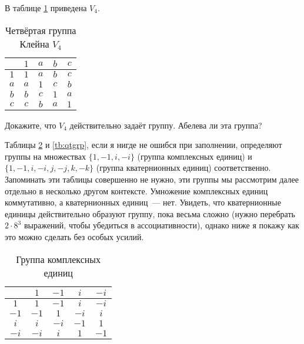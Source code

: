 \begin{example}
	В таблице \ref{tb:v4} приведена  $V_4$.
\end{example}

\begin{table}[h]
	\centering
	\begin{tabular}{c|cccc}
		& $1$ & $a$ & $b$ & $c$ \\ 
		\hline $1$ & $1$ & $a$ & $b$ & $c$ \\ 
		$a$ & $a$ & $1$ & $c$ & $b$ \\ 
		$b$ & $b$ & $c$ & $1$ & $a$ \\ 
		$c$ & $c$ & $b$ & $a$ & $1$ \\ 
	\end{tabular}
	\caption{Четвёртая группа Клейна $V_4$}\label{tb:v4}
\end{table}

\begin{exercise}
	Докажите, что $V_4$ действительно задаёт группу. Абелева ли эта группа?
\end{exercise}

\begin{example}
	Таблицы \ref{tb:cmplxgrp} и \ref{tb:qtgrp}, если я нигде не ошибся при заполнении, определяют группы на множествах $\{1, -1, i, -i\}$ (группа комплексных единиц) и $\{1, -1, i, -i, j, -j, k, -k\}$ (группа кватернионных единиц) соответственно. Запоминать эти таблицы совершенно не нужно, эти группы мы рассмотрим далее отдельно в несколько другом контексте. Умножение комплексных единиц коммутативно, а кватернионных единиц~--- нет. Увидеть, что кватернионные единицы действительно образуют группу, пока весьма сложно (нужно перебрать $2\cdot 8^3$ выражений, чтобы убедиться в ассоциативности), однако ниже я покажу как это можно сделать без особых усилий.
\end{example}

\begin{table}[h]
	\centering
	\begin{tabular}{c|cccc}
		& $1$ & $-1$ & $i$ & $-i$ \\ 
		\hline $1$ & $1$ & $-1$ & $i$ & $-i$ \\ 
		$-1$ & $-1$ & $1$ & $-i$ & $i$ \\ 
		$i$ & $i$ & $-i$ & $-1$ & $1$ \\ 
		$-i$ & $-i$ & $i$ & $1$ & $-1$ \\ 
	\end{tabular} 
	\caption{Группа комплексных единиц}\label{tb:cmplxgrp}
\end{table}

